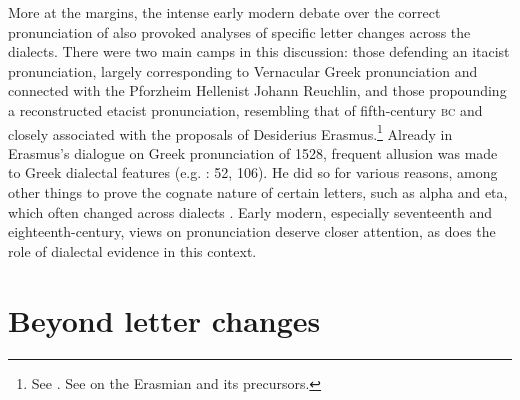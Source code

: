 More at the margins, the intense early modern debate over the correct pronunciation of  also provoked analyses of specific letter changes across the dialects. There were two main camps in this discussion: those defending an itacist pronunciation, largely corresponding to Vernacular Greek pronunciation and connected with the Pforzheim Hellenist Johann Reuchlin, and those propounding a reconstructed etacist pronunciation, resembling that of fifth-century \textsc{bc}  and closely associated with the proposals of Desiderius Erasmus.\footnote{See \citet[130]{Sandys1908}. See \citet{Bywater1908} on the Erasmian  and its precursors.} Already in Erasmus’s dialogue on Greek pronunciation of 1528, frequent allusion was made to Greek dialectal features (e.g. \citealt{Erasmus1528}: 52, 106). He did so for various reasons, among other things to prove the cognate nature of certain letters, such as alpha and eta, which often changed across dialects \citep[62]{Erasmus1528}. Early modern, especially seventeenth and eighteenth-century, views on  pronunciation deserve closer attention, as does the role of dialectal evidence in this context.

\section{Beyond letter changes}\label{sec:6.3}

